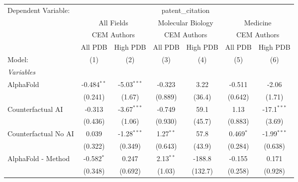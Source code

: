 \begingroup
\centering
\begin{tabular}{lcccccc}
   \tabularnewline \midrule \midrule
   Dependent Variable: & \multicolumn{6}{c}{patent\_citation}\\
 & \multicolumn{2}{c}{All Fields} & \multicolumn{2}{c}{Molecular Biology} & \multicolumn{2}{c}{Medicine} \\
\cmidrule(lr){2-3} \cmidrule(lr){4-5} \cmidrule(lr){6-7}
 & \multicolumn{2}{c}{CEM Authors} & \multicolumn{2}{c}{CEM Authors} & \multicolumn{2}{c}{CEM Authors} \\
\cmidrule(lr){2-3} \cmidrule(lr){4-5} \cmidrule(lr){6-7}
 & \multicolumn{1}{c}{All PDB} & \multicolumn{1}{c}{High PDB} & \multicolumn{1}{c}{All PDB} & \multicolumn{1}{c}{High PDB} & \multicolumn{1}{c}{All PDB} & \multicolumn{1}{c}{High PDB} \\
\cmidrule(lr){2-2} \cmidrule(lr){3-3} \cmidrule(lr){4-4} \cmidrule(lr){5-5} \cmidrule(lr){6-6} \cmidrule(lr){7-7}
   Model:                                                     & (1)           & (2)           & (3)           & (4)     & (5)           & (6)\\  
   \midrule
   \emph{Variables}\\
   AlphaFold                                                  & -0.484$^{**}$ & -5.03$^{***}$ & -0.323        & 3.22    & -0.511        & -2.06\\   
                                                              & (0.241)       & (1.67)        & (0.889)       & (36.4)  & (0.642)       & (1.71)\\   
   Counterfactual AI                                          & -0.313        & -3.67$^{***}$ & -0.749        & 59.1    & 1.13          & -17.1$^{***}$\\   
                                                              & (0.436)       & (1.06)        & (0.930)       & (45.7)  & (0.883)       & (3.69)\\   
   Counterfactual No AI                                       & 0.039         & -1.28$^{***}$ & 1.27$^{**}$   & 57.8    & 0.469$^{*}$   & -1.99$^{***}$\\   
                                                              & (0.322)       & (0.349)       & (0.643)       & (43.9)  & (0.284)       & (0.638)\\   
   AlphaFold - Method                                         & -0.582$^{*}$  & 0.247         & 2.13$^{**}$   & -188.8  & -0.155        & 0.171\\   
                                                              & (0.348)       & (0.692)       & (1.03)        & (132.7) & (0.258)       & (0.928)\\   

\end{tabular}
